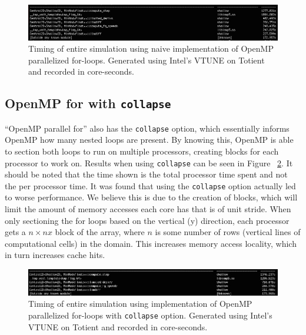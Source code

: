 \documentclass[12pt]{article}
\begin{document}
		
		\begin{figure}[h]
			\begin{center}
				\includegraphics[width=0.7\columnwidth]{naive_omp}
				\caption{Timing of entire simulation using naive implementation of OpenMP parallelized for-loops. Generated using Intel's VTUNE on Totient and recorded in core-seconds.}
				\label{naive_omp}
			\end{center}
		\end{figure}
		
		\subsection{OpenMP for with \texttt{collapse}}
		``OpenMP parallel for'' also has the \texttt{collapse} option, which essentially informs OpenMP how many nested loops are present. By knowing this, OpenMP is able to section both loops to run on multiple processors, creating blocks for each processor to work on. Results when using \texttt{collapse} can be seen in Figure ~\ref{collapse_omp}. It should be noted that the time shown is the total processor time spent and not the per processor time. It was found that using the \texttt{collapse} option actually led to worse performance. We believe this is due to the creation of blocks, which will limit the amount of memory accesses each core has that is of unit stride. When only sectioning the for loops based on the vertical (y) direction, each processor gets a $n \times nx$ block of the array, where $n$ is some number of rows (vertical lines of computational cells) in the domain. This increases memory access locality, which in turn increases cache hits.
			
			
		\begin{figure}[h]
			\begin{center}
				\includegraphics[width=0.7\columnwidth]{collapse_omp}
				\caption{Timing of entire simulation using implementation of OpenMP parallelized for-loops with \texttt{collapse} option. Generated using Intel's VTUNE on Totient and recorded in core-seconds.}
				\label{collapse_omp}
			\end{center}
		\end{figure}
		
\end{document}
